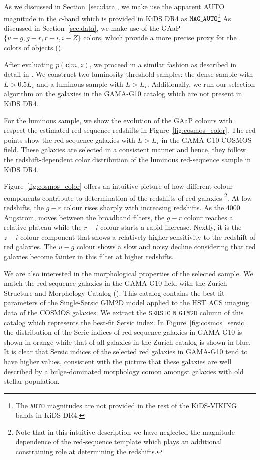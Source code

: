 \documentclass[fleqn,usenatbib,useAMS]{mnras}
\begin{document}
As we discussed in Section~\ref{sec:data}, we make use the apparent AUTO magnitude in the $r$-band which is provided in KiDS DR4 as $\mathtt{MAG\_AUTO}$\footnote{The $\mathtt{AUTO}$ magnitudes are not provided in the rest of the KiDS-VIKING bands in KiDS DR4.} As discussed in Section~\ref{sec:data}, we make use of the GAaP $\{u-g,g-r,r-i,i-Z\}$ colors, which provide a more precise proxy for the colors of objects (\citealt{kuijken2019}). 

After evaluating $p(\boldsymbol{c}|m,z)$, we proceed in a similar fashion as described in detail in \citet{rozo2016, vakili2019}. We construct two luminosity-threshold samples: the dense sample with $L>0.5 L_{\star}$ and a luminous sample with $L>L_{\star}$. 
Additionally, we run our selection algorithm on the galaxies in the GAMA-G10 catalog which are not present in KiDS DR4.

For the luminous sample, we show the evolution of the GAaP colours with respect the estimated red-sequence redshifts in Figure~\ref{fig:cosmos_color}. The red points show the red-sequence galaxies with $L>L_{\star}$ in the GAMA-G10 COSMOS field. These galaxies are selected in a consistent manner and hence, they follow the redshift-dependent color distribution of the luminous red-sequence sample in KiDS DR4. 

Figure~\ref{fig:cosmos_color} offers an intuitive picture of how different colour components contribute to determination of the redshifts of red galaxies \footnote{Note that in this intuitive description we have neglected the magnitude dependence of the red-sequence template which plays an additional constraining role at determining the redshifts.}. At low redshifts, the $g-r$ colour rises sharply with increasing redshifts. As the 4000 Angstrom, moves between the broadband filters, the $g-r$ colour reaches a relative plateau while the $r-i$ colour starts a rapid increase. Nextly, it is the $z-i$ colour component that shows a relatively higher sensitivity to the redshift of red galaxies. The $u-g$ colour shows a slow and noisy decline considering that red galaxies become fainter in this filter at higher redshifts. 

We are also interested in the morphological properties of the selected sample. We match the red-sequence galaxies in the GAMA-G10 field with the Zurich Structure and Morphology Catalog (\citealt{scarlata2007, sargent2007}). This catalog contains the best-fit parameters of the Single-Sersic GIM2D model applied to the HST ACS imaging data of the COSMOS galaxies. We extract the $\mathtt{SERSIC\_N\_GIM2D}$ column of this catalog which represents the best-fit Sersic index. In Figure~\ref{fig:cosmos_sersic} the distribution of the Seric indices of red-sequence galaxies in GAMA G10 is shown in orange while that of all galaxies in the Zurich catalog is shown in blue. It is clear that Sersic indices of the selected red galaxies in GAMA-G10 tend to have higher values, consistent with the picture that these galaxies are well described by a bulge-dominated morphology comon amongst galaxies with old stellar population.
\end{document}
